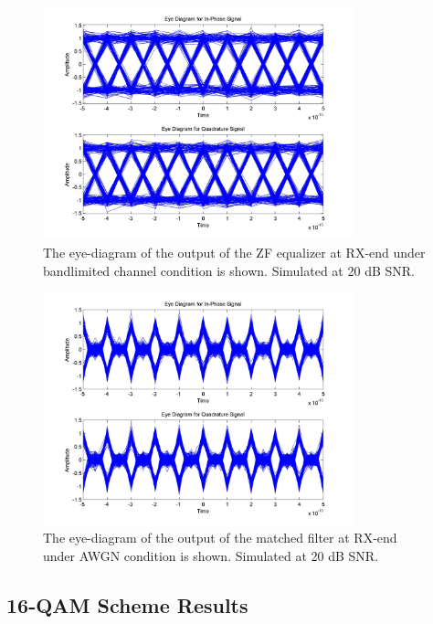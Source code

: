 \documentclass[]{article}
\begin{document}
\begin{figure}[H]
\centering
\includegraphics[width=0.8\textwidth]{equalized_eye_qpsk20.jpg}
\caption{ The eye-diagram of the output of the ZF equalizer at RX-end under bandlimited channel condition is shown. Simulated at 20 dB SNR.\label{fig:qpEyeEqu}}
\end{figure}


\begin{figure}[H]
\centering
\includegraphics[width=0.8\textwidth]{awgn_eye_qpsk20.jpg}
\caption{The eye-diagram of the output of the matched filter at RX-end under AWGN condition is shown. Simulated at 20 dB SNR. \label{fig:qpEyeAWGN}}
\end{figure}

\subsection{16-QAM Scheme Results}
\end{document}
